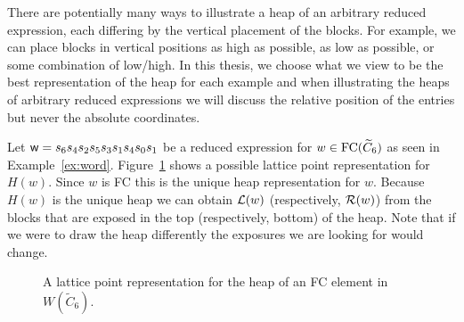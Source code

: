 There are potentially many ways to illustrate a heap of an arbitrary reduced expression, each differing by the vertical placement of the blocks. For example, we can place blocks in vertical positions as high as possible, as low as possible, or some combination of low/high. In this thesis, we choose what we view to be the best representation of the heap for each example and when illustrating the heaps of arbitrary reduced expressions we will discuss the relative position of the entries but never the absolute coordinates. 


\begin{example}
	Let $\mathsf{w}=s_6s_4s_2s_5s_3s_1s_4s_0s_1$ be a reduced expression for $w \in \mathrm{FC}(\widetilde{C}_6)$ as seen in Example~\ref{ex:word}. Figure~\ref{fig:FC heap} shows a possible lattice point representation for $H(w)$. Since $w$ is FC this is the unique heap representation for $w$. Because $H(w)$ is the unique heap we can obtain $\mathcal{L}(w)$ (respectively, $\mathcal{R}(w)$) from the blocks that are exposed in the top (respectively, bottom) of the heap. Note that if we were to draw the heap differently the exposures we are looking for would change.
\begin{figure}[h]
\centering
{}
\caption{A lattice point representation for the heap of an FC element in $W(\widetilde{C}_6)$.}
\label{fig:FC heap}
\end{figure}
\end{example}


